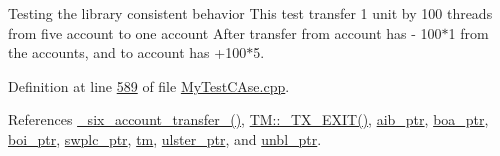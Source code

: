 Testing the library consistent behavior This test transfer 1 unit by 100 threads from five account to one account After transfer from account has -\/ 100$\ast$1 from the accounts, and to account has +100$\ast$5. 



Definition at line \hyperlink{_my_test_c_ase_8cpp_source_l00589}{589} of file \hyperlink{_my_test_c_ase_8cpp_source}{My\+Test\+C\+Ase.\+cpp}.



References \hyperlink{_my_test_c_ase_8cpp_source_l00194}{\+\_\+six\+\_\+account\+\_\+transfer\+\_\+()}, \hyperlink{_t_m_8cpp_source_l00102}{T\+M\+::\+\_\+\+T\+X\+\_\+\+E\+X\+I\+T()}, \hyperlink{_my_test_c_ase_8h_source_l00066}{aib\+\_\+ptr}, \hyperlink{_my_test_c_ase_8h_source_l00068}{boa\+\_\+ptr}, \hyperlink{_my_test_c_ase_8h_source_l00067}{boi\+\_\+ptr}, \hyperlink{_my_test_c_ase_8h_source_l00069}{swplc\+\_\+ptr}, \hyperlink{_my_test_c_ase_8h_source_l00065}{tm}, \hyperlink{_my_test_c_ase_8h_source_l00070}{ulster\+\_\+ptr}, and \hyperlink{_my_test_c_ase_8h_source_l00071}{unbl\+\_\+ptr}.


